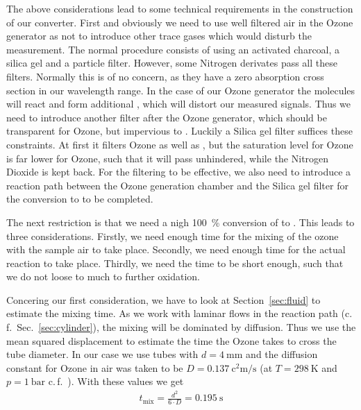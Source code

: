 The above considerations lead to some technical requirements in the
construction of our converter. First and obviously we need to use well
filtered air in the Ozone generator as not to introduce other trace
gases which would disturb the measurement. The normal procedure
consists of using an activated charcoal, a silica gel and a particle
filter. However, some Nitrogen derivates pass all these
filters. Normally this is of no concern, as they have a zero
absorption cross section in our wavelength range. In the case of our
Ozone generator the molecules will react and form additional ,
which will distort our measured signals. Thus we need to introduce
another filter after the Ozone generator, which should be transparent
for Ozone, but impervious to . Luckily a Silica gel filter
suffices these constraints. At first it filters Ozone as well as
, but the saturation level for Ozone is far lower for Ozone,
such that it will pass unhindered, while the Nitrogen Dioxide is kept
back. For the filtering to be effective, we also need to introduce a
reaction path between the Ozone generation chamber and the Silica gel
filter for the conversion to  to be completed.

The next restriction is that we need a nigh \SI{100}{\%} conversion of
 to . This leads to three considerations. Firstly, we
need enough time for the mixing of the ozone with the sample air to
take place. Secondly, we need enough time for the actual reaction to
take place. Thirdly, we need the time to be short enough, such that we
do not loose to much  to further oxidation.

Concering our first consideration, we have to look at
Section~\ref{sec:fluid} to estimate the mixing time. As we work with
laminar flows in the reaction path (c.\,f.\ Sec.~\ref{sec:cylinder}),
the mixing will be dominated by diffusion. Thus we use the mean
squared displacement to estimate the time the Ozone takes to cross the
tube diameter. In our case we use tubes with $d =
\SI{4}{\milli\meter}$ and the diffusion constant for Ozone in air was
taken to be $D = \SI{0.137}{\square\centi\meter\per\second}$ (at $T =
\SI{298}{\kelvin}$ and $p = \SI{1}{\text{bar}}$
c.\,f.~\cite{diff-ozone}). With these values we get
\begin{align*}
  t_{\text{mix}} = \frac{d^2}{6\cdot D} = \SI{0.195}{\second}
\end{align*}

